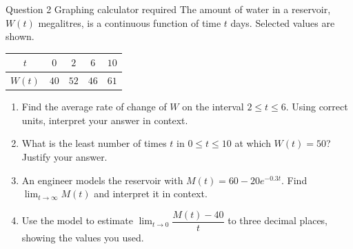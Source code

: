 \documentclass[11pt]{article}
\begin{document}
\newpage
\begin{frbox}{Question 2 \textperiodcentered{} Graphing calculator required}
The amount of water in a reservoir, $W(t)$ megalitres, is a continuous function of time $t$ days. Selected values are shown.
\begin{center}\renewcommand{\arraystretch}{1.25}\begin{tabular}{|c|c|c|c|c|}\hline $t$ & $0$ & $2$ & $6$ & $10$ \\ \hline $W(t)$ & $40$ & $52$ & $46$ & $61$ \\ \hline\end{tabular}\end{center}
\begin{enumerate}[label=(\alph*),leftmargin=*,itemsep=2pt]
  \item Find the average rate of change of $W$ on the interval $2\le t\le6$. Using correct units, interpret your answer in context.\work{3cm}
  \item What is the least number of times $t$ in $0\le t\le10$ at which $W(t)=50$? Justify your answer.\work{3.2cm}
  \item An engineer models the reservoir with $M(t)=60-20e^{-0.3t}$. Find $\displaystyle\lim_{t\to \infty}M(t)$ and interpret it in context.\work{2.6cm}
  \item Use the model to estimate $\displaystyle\lim_{t\to 0}\dfrac{M(t)-40}{t}$ to three decimal places, showing the values you used.\work{3cm}
\end{enumerate}
\end{frbox}
\end{document}
